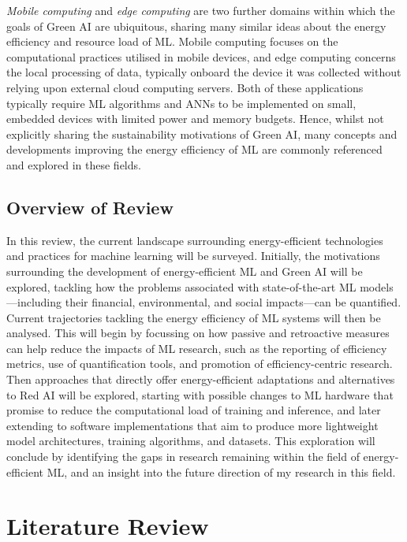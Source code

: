 \documentclass[a4paper, 12pt]{article}
\begin{document}
    \emph{Mobile computing} and \emph{edge computing} are two further domains within which the goals of Green AI are ubiquitous, sharing many similar ideas about the energy efficiency and resource load of ML. Mobile computing focuses on the computational practices utilised in mobile devices, and edge computing concerns the local processing of data, typically onboard the device it was collected without relying upon external cloud computing servers. Both of these applications typically require ML algorithms and ANNs to be implemented on small, embedded devices with limited power and memory budgets. Hence, whilst not explicitly sharing the sustainability motivations of Green AI, many concepts and developments improving the energy efficiency of ML are commonly referenced and explored in these fields.

    \subsection{Overview of Review}

    In this review, the current landscape surrounding energy-efficient technologies and practices for machine learning will be surveyed. Initially, the motivations surrounding the development of energy-efficient ML and Green AI will be explored, tackling how the problems associated with state-of-the-art ML models---including their financial, environmental, and social impacts---can be quantified. Current trajectories tackling the energy efficiency of ML systems will then be analysed. This will begin by focussing on how passive and retroactive measures can help reduce the impacts of ML research, such as the reporting of efficiency metrics, use of quantification tools, and promotion of efficiency-centric research. Then approaches that directly offer energy-efficient adaptations and alternatives to Red AI will be explored, starting with possible changes to ML hardware that promise to reduce the computational load of training and inference, and later extending to software implementations that aim to produce more lightweight model architectures, training algorithms, and datasets. This exploration will conclude by identifying the gaps in research remaining within the field of energy-efficient ML, and an insight into the future direction of my research in this field.

    \section{Literature Review}
\end{document}
